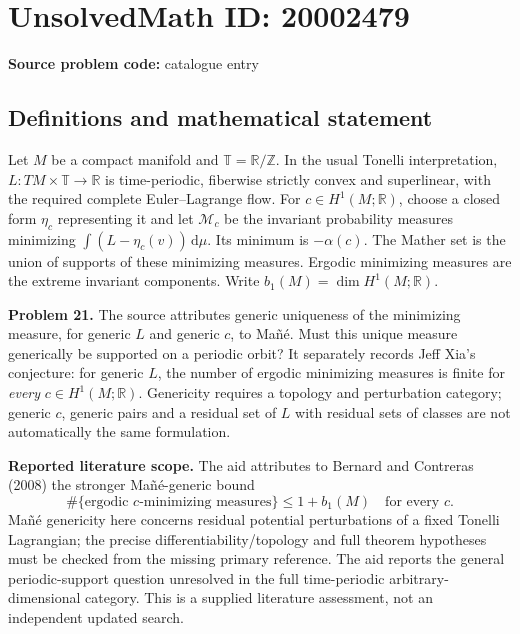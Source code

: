 \documentclass[11pt]{article}
\newcommand{\Z}{\mathbb{Z}}
\newcommand{\R}{\mathbb{R}}
\begin{document}
\section*{UnsolvedMath ID: 20002479}
\textbf{Source problem code:} catalogue entry
\subsection{Definitions and mathematical statement}
Let \(M\) be a compact manifold and \(\mathbb T=\R/\Z\). In the usual Tonelli interpretation, \(L:TM\times\mathbb T\to\R\) is time-periodic, fiberwise strictly convex and superlinear, with the required complete Euler--Lagrange flow. For \(c\in H^1(M;\R)\), choose a closed form \(\eta_c\) representing it and let \(\mathcal M_c\) be the invariant probability measures minimizing \(\int(L-\eta_c(v))\,\mathrm d\mu\). Its minimum is \(-\alpha(c)\). The Mather set is the union of supports of these minimizing measures. Ergodic minimizing measures are the extreme invariant components. Write \(b_1(M)=\dim H^1(M;\R)\).

\textbf{Problem 21.} The source attributes generic uniqueness of the minimizing measure, for generic \(L\) and generic \(c\), to Ma\~n\'e. Must this unique measure generically be supported on a periodic orbit? It separately records Jeff Xia's conjecture: for generic \(L\), the number of ergodic minimizing measures is finite for \emph{every} \(c\in H^1(M;\R)\). Genericity requires a topology and perturbation category; generic \(c\), generic pairs and a residual set of \(L\) with residual sets of classes are not automatically the same formulation.

\textbf{Reported literature scope.} The aid attributes to Bernard and Contreras (2008) the stronger Ma\~n\'e-generic bound
\[
 \#\{\text{ergodic }c\text{-minimizing measures}\}\leq1+b_1(M)
 \quad\text{for every }c.
\]
Ma\~n\'e genericity here concerns residual potential perturbations of a fixed Tonelli Lagrangian; the precise differentiability/topology and full theorem hypotheses must be checked from the missing primary reference. The aid reports the general periodic-support question unresolved in the full time-periodic arbitrary-dimensional category. This is a supplied literature assessment, not an independent updated search.
\end{document}
